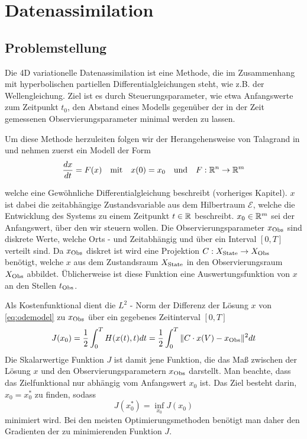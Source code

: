 \chapter{Datenassimilation}
\section{Problemstellung}
Die 4D variationelle Datenassimilation ist eine Methode, die im Zusammenhang mit hyperbolischen partiellen Differentialgleichungen steht, wie z.B. der Wellengleichung. Ziel ist es durch Steuerungsparameter, wie etwa Anfangswerte zum Zeitpunkt $t_0$, den Abstand eines Modells gegenüber der in der Zeit gemessenen Observierungsparameter minimal werden zu lassen. 

Um diese Methode herzuleiten folgen wir der Herangehensweise von Talagrand in \cite{talagrand1987variational} und nehmen zuerst ein Modell der Form
\begin{equation}
\label{eq:odemodel}
 \frac{dx}{dt} = F(x)\quad \text{mit} \quad x(0) = x_0 \quad \text{und}\quad F:\mathbb{R}^n\to \mathbb{R}^m
\end{equation}
  
welche eine Gewöhnliche Differentialgleichung beschreibt (vorheriges Kapitel). $x$ ist dabei die zeitabhängige Zustandsvariable aus dem Hilbertraum $\mathcal{E}$, welche die Entwicklung des Systems zu einem Zeitpunkt $t\in \mathbb{R}$ beschreibt. 
$x_0 \in \mathbb{R}^m$ sei der Anfangswert, über den wir steuern wollen.
Die Observierungsparameter $x_{\text{Obs}}$ sind diskrete Werte, welche Orts - und Zeitabhängig und über ein Interval $[0,T]$ verteilt sind. Da $x_{\text{Obs}}$ diskret ist wird eine Projektion $C:X_{\text{State}}\to X_{\text{Obs}}$ benötigt, welche $x$ aus dem Zustandsraum $X_{\text{State}}$ in den Observierungsraum $X_{\text{Obs}}$ abbildet. Üblicherweise ist diese Funktion eine Auswertungsfunktion von $x$ an den Stellen $t_{\text{Obs}}$.

Als Kostenfunktional dient die $L^2$ - Norm der Differenz der Lösung $x$ von \eqref{eq:odemodel} zu $x_{\text{Obs}}$ über ein gegebenes Zeitinterval $[0,T]$
\begin{equation}
\label{eq:costfunctional}
 J(x_0) = \frac{1}{2}\int_0^T H(x(t),t)dt= \frac{1}{2}\int_0^T \|C\cdot x(V)-x_{\text{Obs}}\|^2dt
\end{equation}
Die Skalarwertige Funktion $J$ ist damit jene Funktion, die das Maß zwischen der Lösung $x$ und den Observierungsparametern $x_{\text{Obs}}$ darstellt.
Man beachte, dass das Zielfunktional nur abhängig vom Anfangswert $x_0$ ist. Das Ziel besteht darin, $x_0 = x_0^*$ zu finden, sodass
\[
 J(x_0^*) = \inf_{x_0} J(x_0) 
\]
minimiert wird. Bei den meisten Optimierungsmethoden benötigt man daher den Gradienten der zu minimierenden Funktion $J$.

